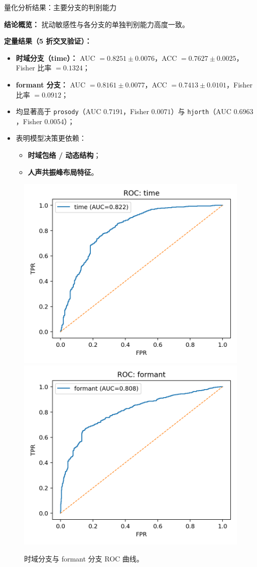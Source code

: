 \documentclass[aspectratio=169]{beamer}
\begin{document}
\begin{frame}{量化分析结果：主要分支的判别能力}

\textbf{结论概览：}
扰动敏感性与各分支的单独判别能力高度一致。

\vspace{0.6em}
\textbf{定量结果（5 折交叉验证）：}
\begin{itemize}
  \item \textbf{时域分支（time）：}  
    AUC $=0.8251\!\pm\!0.0076$，ACC $=0.7627\!\pm\!0.0025$，Fisher 比率 $=0.1324$；
  \item \textbf{formant 分支：}  
    AUC $=0.8161\!\pm\!0.0077$，ACC $=0.7413\!\pm\!0.0101$，Fisher 比率 $=0.0912$；
  \item 均显著高于 \texttt{prosody}（AUC $0.7191$，Fisher $0.0071$）与  
        \texttt{hjorth}（AUC $0.6963$，Fisher $0.0054$）；
  \item 表明模型决策更依赖：
    \begin{itemize}
      \item \textbf{时域包络 / 动态结构}；
      \item \textbf{人声共振峰布局特征}。
    \end{itemize}
\end{itemize}

\vspace{0.6em}
\begin{figure}
  \centering
  \includegraphics[width=0.45\linewidth]{images_in_paper/roc_time.png}
  \hfill
  \includegraphics[width=0.45\linewidth]{images_in_paper/roc_formant.png}
  \caption{时域分支与 formant 分支 ROC 曲线。}
  \label{fig:roc}
\end{figure}

\end{frame}
\end{document}
